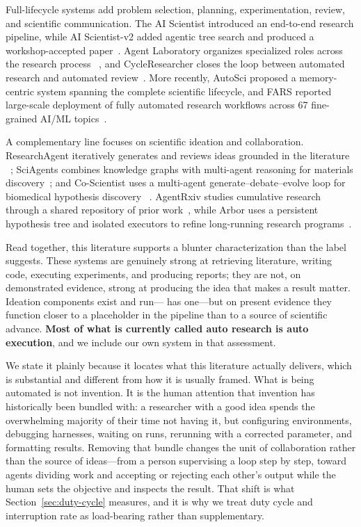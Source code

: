 Full-lifecycle systems add problem selection, planning, experimentation, review,
and scientific communication. The AI Scientist introduced an end-to-end research
pipeline, while AI Scientist-v2 added agentic tree search and produced a
workshop-accepted paper~\citep{lu2024aiscientist,yamada2025aiscientistv2}. Agent
Laboratory organizes specialized roles across the research process
~\citep{schmidgall2025agentlab}, and CycleResearcher closes the loop between
automated research and automated review~\citep{weng2025cycleresearcher}. More
recently, AutoSci proposed a memory-centric system spanning the complete scientific
lifecycle, and FARS reported large-scale deployment of fully automated research
workflows across 67 fine-grained AI/ML topics~\citep{qian2026autosci,tang2026fars}.

A complementary line focuses on scientific ideation and collaboration.
ResearchAgent iteratively generates and reviews ideas grounded in the literature
~\citep{baek2024researchagent}; SciAgents combines knowledge graphs with multi-agent
reasoning for materials discovery~\citep{ghafarollahi2024sciagents}; and Co-Scientist
uses a multi-agent generate--debate--evolve loop for biomedical hypothesis discovery
~\citep{gottweis2025coscientist}. AgentRxiv studies cumulative research through a
shared repository of prior work~\citep{schmidgall2025agentrxiv}, while Arbor uses a
persistent hypothesis tree and isolated executors to refine long-running research
programs~\citep{jin2026arbor}.

Read together, this literature supports a blunter characterization than the label
suggests. These systems are genuinely strong at retrieving literature, writing code,
executing experiments, and producing reports; they are not, on demonstrated evidence,
strong at producing the idea that makes a result matter. Ideation components exist and
run---\systemname{} has one---but on present evidence they function closer to a
placeholder in the pipeline than to a source of scientific advance. \textbf{Most of
what is currently called auto research is auto execution}, and we include our own
system in that assessment.

We state it plainly because it locates what this literature actually delivers, which
is substantial and different from how it is usually framed. What is being automated
is not invention. It is the human attention that invention has historically been
bundled with: a researcher with a good idea spends the overwhelming majority of their
time not having it, but configuring environments, debugging harnesses, waiting on
runs, rerunning with a corrected parameter, and formatting results. Removing that
bundle changes the unit of collaboration rather than the source of ideas---from a
person supervising a loop step by step, toward agents dividing work and accepting or
rejecting each other's output while the human sets the objective and inspects the
result. That shift is what Section~\ref{sec:duty-cycle} measures, and it is why we
treat duty cycle and interruption rate as load-bearing rather than supplementary.

